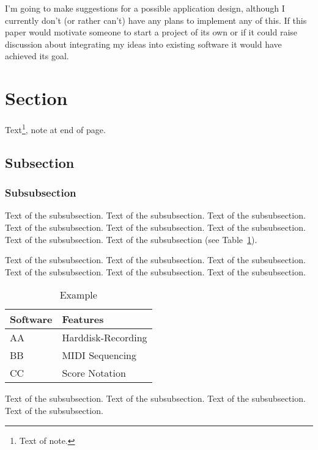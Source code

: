 \documentclass[11pt,a4paper]{article}
\begin{document}
I'm going to make suggestions for a possible application design, although I currently don't (or rather can't) have any plans to implement any of this.
If this paper would motivate someone to start a project of its own or if it could raise discussion about integrating my ideas into existing software it would have achieved its goal.


\section{Section}

Text\footnote{Text of note.}, note at end of page.


\subsection{Subsection}


 
\subsubsection{Subsubsection}

Text of the subsubsection.
Text of the subsubsection.
Text of the subsubsection.
Text of the subsubsection.
Text of the subsubsection.
Text of the subsubsection.
Text of the subsubsection.
Text of the subsubsection (see Table~\ref{table1}).

Text of the subsubsection.
Text of the subsubsection.
Text of the subsubsection.
Text of the subsubsection.
Text of the subsubsection.
Text of the subsubsection.


\begin{table}[h]
 \begin{center}
\begin{tabular}{|l|l|}

      \hline
      Software & Features\\
      \hline\hline
      AA & Harddisk-Recording\\
      BB & MIDI Sequencing\\
      CC & Score Notation\\
      \hline

\end{tabular}
\caption{Example}\label{table1}
 \end{center}
\end{table}


Text of the subsubsection.
Text of the subsubsection.
Text of the subsubsection.
Text of the subsubsection.
\end{document}
